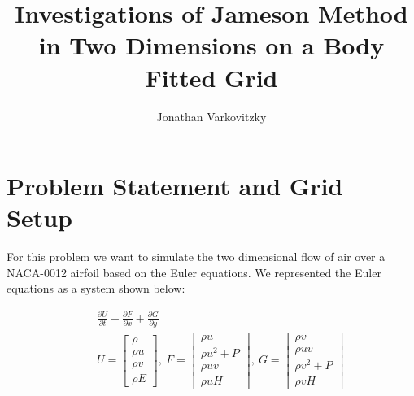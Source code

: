 \documentclass[a4paper,12pt,titlepage]{article}
\begin{document}
\title{Investigations of Jameson Method in Two Dimensions on a Body Fitted Grid}
\author{Jonathan Varkovitzky}
\maketitle


\pagestyle{plain} %
\tableofcontents

\newpage

\setcounter{page}{2}


\newpage

\section{Problem Statement and Grid Setup}

For this problem we want to simulate the two dimensional flow of air over a NACA-0012 airfoil based on the Euler equations.  We represented the Euler equations as a system shown below:

\begin{eqnarray}
&& \frac{\partial U}{\partial t} + \frac{\partial F}{\partial x} + \frac{\partial G}{\partial y}\nonumber \\
&& U = \begin{bmatrix} \rho \\ \rho u \\ \rho v \\ \rho E \end{bmatrix},\ 
   F = \begin{bmatrix} \rho u\\ \rho u^2+P\\ \rho u v \\ \rho u H\end{bmatrix},\
   G = \begin{bmatrix} \rho v\\ \rho u v\\ \rho v^2 + P \\ \rho v H\end{bmatrix}
\end{eqnarray}
\end{document}
